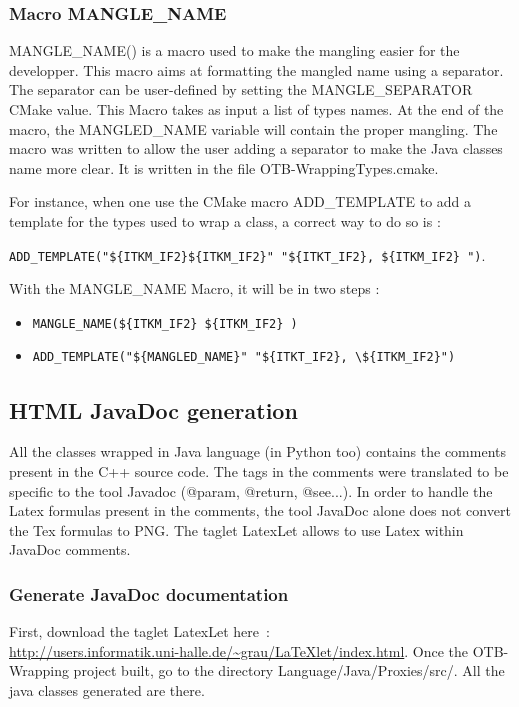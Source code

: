 \subsubsection{Macro MANGLE\_NAME}
MANGLE\_NAME() is a macro used to make the mangling easier for the developper. 
This macro aims at formatting the mangled name using a separator. The separator can be user-defined by
setting the MANGLE\_SEPARATOR CMake value. This Macro takes as input a  list of types names.
At the end of the macro, the MANGLED\_NAME variable will contain the proper mangling. 
The macro was written to allow the user adding a separator to make the Java classes name more clear.
It is written in the file OTB-WrappingTypes.cmake. 

For instance, when one use the CMake macro  ADD\_TEMPLATE to add a template 
for the types used to wrap a class, a correct way to do so is :

\verb!ADD_TEMPLATE("${ITKM_IF2}${ITKM_IF2}" "${ITKT_IF2}, ${ITKM_IF2} ")!.

With the MANGLE\_NAME Macro, it will be in two steps : 
\begin{itemize}
\item\verb!MANGLE_NAME(${ITKM_IF2} ${ITKM_IF2} )!
\item\verb!ADD_TEMPLATE("${MANGLED_NAME}" "${ITKT_IF2}, \${ITKM_IF2}")!
\end{itemize}

\subsection{HTML JavaDoc generation}

All the classes wrapped in Java language (in Python too) contains the comments 
present in the C++ source code. The tags in the comments were translated to be 
specific to the tool Javadoc (@param, @return, @see...). 
In order to handle the Latex formulas present in the comments, the tool JavaDoc alone 
does not convert the Tex formulas to PNG. The taglet LatexLet allows to use Latex within 
JavaDoc comments. 

\subsubsection{Generate JavaDoc documentation}

First, download the taglet LatexLet 
here~:\\ \url{http://users.informatik.uni-halle.de/~grau/LaTeXlet/index.html}. 
Once the OTB-Wrapping project built, go to the directory Language/Java/Proxies/src/. 
All the java classes generated are there.

